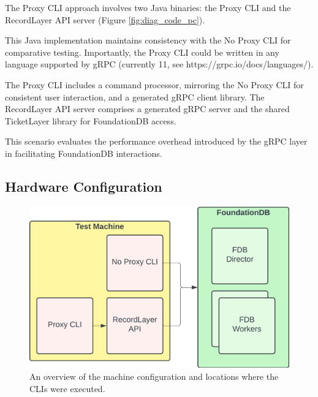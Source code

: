 \documentclass[sigconf]{acmart}
\begin{document}
The Proxy CLI approach involves two Java binaries: the Proxy CLI and the RecordLayer API server (Figure \ref{fig:diag_code_pc}).

This Java implementation maintains consistency with the No Proxy CLI for comparative testing.
Importantly, the Proxy CLI could be written in any language supported by gRPC (currently 11, see https://grpc.io/docs/languages/).

The Proxy CLI includes a command processor, mirroring the No Proxy CLI for consistent user interaction, and a generated gRPC client library. The RecordLayer API server comprises a generated gRPC server and the shared TicketLayer library for FoundationDB access.

This scenario evaluates the performance overhead introduced by the gRPC layer in facilitating FoundationDB interactions.

\subsection{Hardware Configuration}

\begin{figure}[h]
  \centering
  \includegraphics[width=\linewidth]{diag_machines.png}
  \caption{An overview of the machine configuration and locations where the CLIs were executed.}
  \label{fig:diag_machines}
\end{figure}
\end{document}
